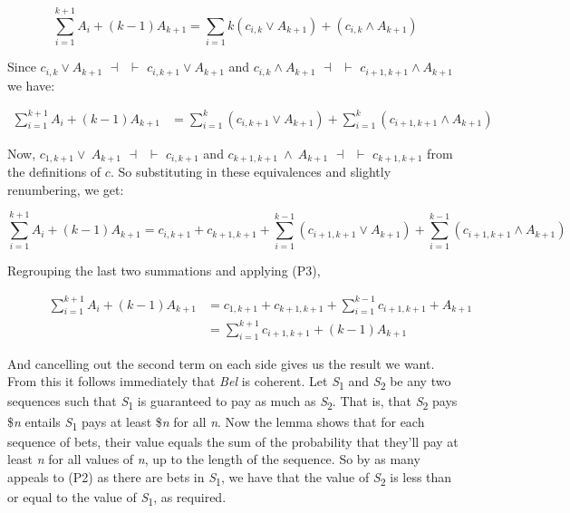 \documentclass[
  11pt,
  letterpaper,
  DIV=11,
  numbers=noendperiod,
  twoside]{scrartcl}
\begin{document}
\[
\sum_{i=1}^{k+1}A_i + (k-1)A_{k+1} = \sum_{i=1}{k}(c_{i,k} \vee A_{k+1}) + (c_{i,k} \wedge A_{k+1})
\]

Since \(c_{i,k} \vee A_{k+1}\) \(\dashv\)~\(\vdash\)
\(c_{i,k+1} \vee A_{k+1}\) and \(c_{i,k} \wedge A_{k+1}\)
\(\dashv\)~\(\vdash\) \(c_{i+1,k+1} \wedge A_{k+1}\) we have:

\[
\begin{aligned}
\sum_{i=1}^{k+1}A_i + (k-1)A_{k+1} &= \sum_{i=1}^{k}(c_{i,k+1} \vee A_{k+1}) + \sum_{i=1}^{k}(c_{i+1,k+1} \wedge A_{k+1})
\end{aligned}
\]

Now, \(c_{1,k+1} \vee~ A_{k+1}\) \(\dashv\)~\(\vdash\) \(c_{i,k+1}\) and
\(c_{k+1,k+1} ~\wedge~ A_{k+1}\) \(\dashv\)~\(\vdash\) \(c_{k+1,k+1}\)
from the definitions of \(c\). So substituting in these equivalences and
slightly renumbering, we get:

\[
\sum_{i=1}^{k+1}A_i + (k-1)A_{k+1} = c_{i,k+1} +c_{k+1,k+1} + \sum_{i=1}^{k-1}(c_{i+1,k+1} \vee A_{k+1}) + \sum_{i=1}^{k-1}(c_{i+1,k+1} \wedge A_{k+1})
\]

Regrouping the last two summations and applying (P3),

\begin{figure}

\[
\begin{aligned}
\sum_{i=1}^{k+1}A_i + (k-1)A_{k+1} &= c_{1,k+1} + c_{k+1,k+1} + \sum_{i=1}^{k-1}c_{i+1,k+1} + A_{k+1} \\
&= \sum_{i=1}^{k+1}c_{i+1,k+1} + (k-1)A_{k+1}
\end{aligned}
\]

\end{figure}%

And cancelling out the second term on each side gives us the result we
want. From this it follows immediately that \emph{Bel} is coherent. Let
\emph{S}\textsubscript{1} and \emph{S}\textsubscript{2} be any two
sequences such that \emph{S}\textsubscript{1} is guaranteed to pay as
much as \emph{S}\textsubscript{2}. That is, that
\emph{S}\textsubscript{2} pays \$\emph{n} entails
\emph{S}\textsubscript{1} pays at least \$\emph{n} for all \emph{n}. Now
the lemma shows that for each sequence of bets, their value equals the
sum of the probability that they'll pay at least \emph{n} for all values
of \emph{n}, up to the length of the sequence. So by as many appeals to
(P2) as there are bets in \emph{S}\textsubscript{1}, we have that the
value of \emph{S}\textsubscript{2} is less than or equal to the value of
\emph{S}\textsubscript{1}, as required.
\end{document}
